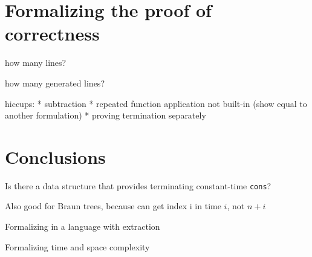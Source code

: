 \documentclass{llncs}
\begin{document}
\section{Formalizing the proof of correctness}

how many lines?

how many generated lines?

hiccups:
* subtraction
* repeated function application not built-in (show equal to another formulation)
* proving termination separately

\section{Conclusions}

Is there a data structure that provides terminating constant-time \verb|cons|?

Also good for Braun trees, because can get index i in time $i$, not $n+i$

Formalizing in a language with extraction

Formalizing time and space complexity



\end{document}
